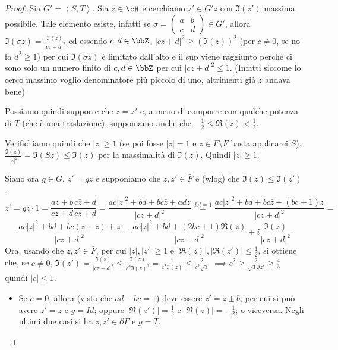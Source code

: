 \begin{proof}
Sia $G'=\left\langle S,T \right\rangle$. Sia $z \in \cH$ e cerchiamo $z' \in G'z$ con $\Im(z')$ massima possibile. Tale elemento esiste, infatti se
$\sigma = \left( \begin{array}{cc} a & b \\ c & d \end{array} \right) \in G'$, allora $\Im(\sigma z) = \frac{\Im(z)}{|cz+d|^2}$ ed essendo
$c,d \in \bbZ$, $|cz+d|^2 \geq (\Im(z))^2$ (per $c \neq 0$, se no fa $d^2 \ge 1$) per cui $\Im(\sigma z)$ è limitato dall'alto e il sup viene raggiunto perché
ci sono solo un numero finito di $c,d \in \bbZ$ per cui $|cz+d|^2 \leq 1$. (Infatti siccome lo cerco massimo voglio denominatore più piccolo di uno,
altrimenti già $z$ andava bene)


Possiamo quindi supporre che $z=z'$ e, a meno di comporre con qualche potenza
di $T$ (che è una traslazione), supponiamo anche che $-\frac{1}{2} \leq \Re(z) < \frac{1}{2}$.

Verifichiamo quindi che $|z| \geq 1$ (se poi fosse $|z|=1$ e
$z \in \bar{F} \setminus F$ basta applicarci $S$).
$\frac{\Im(z)}{|z|^2} = \Im(Sz) \leq \Im(z)$ per la massimalità di $\Im(z)$.
Quindi $|z| \geq 1$.
\vskip 0.5cm

Siano ora $g \in G$, $z'=gz$ e supponiamo che $z,z' \in \bar{F}$ e (wlog)
che $\Im(z) \leq \Im(z')$.
$$
z'= gz \cdot 1 = \frac{az+b}{cz+d} \frac{c \bar{z} +d}{c \bar{z} +d} =
\frac{ac|z|^2 + bd + bc \bar{z} + adz}{|cz+d|^2} \stackrel{det=1}{=}
\frac{ac|z|^2 + bd + bc \bar{z} + (bc+1)z}{|cz+d|^2} =
$$
$$
\frac{ac|z|^2 + bd + bc (\bar{z} + z) + z}{|cz+d|^2} =
\frac{ac|z|^2 + bd + (2bc+1) \Re(z)}{|cz+d|^2} + i \frac{\Im(z)}{|cz+d|^2}
$$
Ora, usando che $z,z' \in \bar{F}$, per cui $|z|,|z'| \geq 1$ e
$|\Re(z)|, |\Re(z')| \leq \frac{1}{2}$, si ottiene che, se $c \neq 0$,
$\Im(z') = \frac{\Im(z)}{|cz+d|^2} \leq \frac{\Im(z)}{c^2 \Im(z)^2}
= \frac{1}{c^2 \Im(z)} \leq \frac{2}{c^2 \sqrt{3}}$ $\implies c^2 \ge \frac{2}{\sqrt{3}\Im z'} \ge \frac{4}{3}$
quindi $|c| \leq 1$.

\begin{itemize}
\item Se $c=0$, allora (visto che $ad - bc = 1$) deve essere $z' = z \pm b$, per cui si può avere $z'=z$ e $g=Id$; oppure
  $|\Re(z')| = \frac{1}{2}$ e $|\Re(z)| = -\frac{1}{2}$; o viceversa.
  Negli ultimi due casi si ha $z,z' \in \partial F$ e $g=T$.


\end{itemize}
\end{proof}
